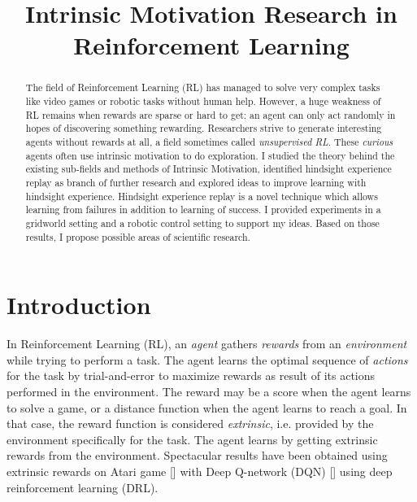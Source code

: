 \documentclass[conference]{IEEEtran}
\begin{document}
\title{
    Intrinsic Motivation Research in Reinforcement Learning
}

\author{
}
\maketitle

\begin{abstract}
The field of Reinforcement Learning (RL) has managed to solve very complex tasks like video games or robotic tasks without human help. However, a huge weakness of RL remains when rewards are sparse or hard to get: an agent can only act randomly in hopes of discovering something rewarding. Researchers strive to generate interesting agents without rewards at all, a field sometimes called \textit{unsupervised RL}. These \textit{curious} agents often use intrinsic motivation to do exploration. I studied the theory behind the existing sub-fields and methods of Intrinsic Motivation, identified hindsight experience replay as branch of further research and explored ideas to improve learning with hindsight experience. Hindsight experience replay is a novel technique which allows learning from failures in addition to learning of success. I provided experiments in a gridworld setting and a robotic control setting to support my ideas. Based on those results, I propose possible areas of scientific research.
\end{abstract}

\section{Introduction}

In Reinforcement Learning (RL), an \textit{agent} gathers \textit{rewards} from an \textit{environment} while trying to perform a task. The agent learns the optimal sequence of \textit{actions} for the task by trial-and-error to maximize rewards as result of its actions performed in the environment. The reward may be a score when the agent learns to solve a game, or a distance function when the agent learns to reach a goal. In that case, the reward function is considered \textit{extrinsic}, i.e. provided by the environment specifically for the task. The agent learns by getting extrinsic rewards from the environment. Spectacular results have been obtained using extrinsic rewards on Atari game [\cite{bellemare2013arcade}] with Deep Q-network (DQN) [\cite{mnih2015human}] using deep reinforcement learning (DRL). 
\end{document}
